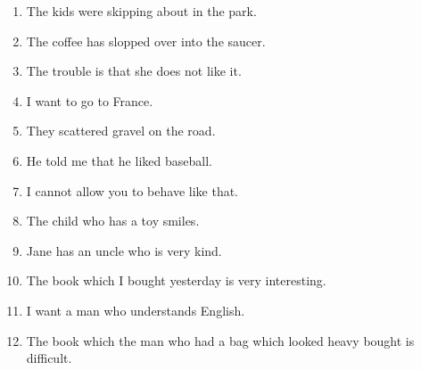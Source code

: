 \begin{enumerate}
\item The kids were skipping about in the park.
\item The coffee has slopped over into the saucer.
\item The trouble is that she does not like it.
\item I want to go to France.
\item They scattered gravel on the road.
\item He told me that he liked baseball.
\item I cannot allow you to behave like that.
\item The child who has a toy smiles.
\item Jane has an uncle who is very kind.
\item The book which I bought yesterday is very interesting.
\item I want a man who understands English.
\item The book which the man who had a bag which looked heavy bought
  is difficult.
\end{enumerate}

